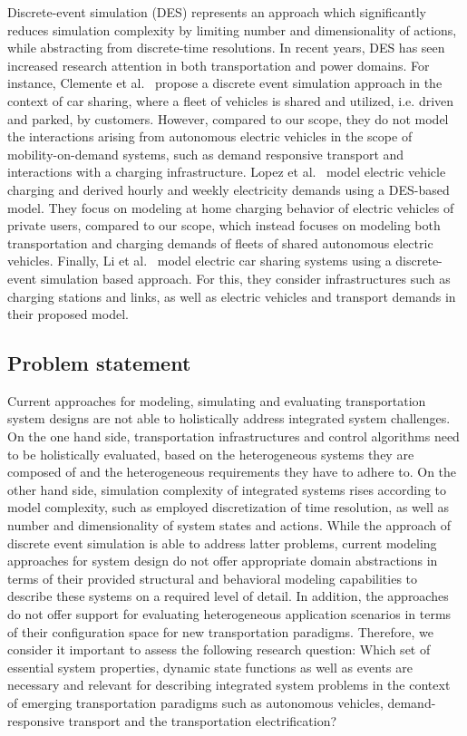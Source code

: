 \documentclass[graybox]{svmult}
\begin{document}
Discrete-event simulation (DES) represents an approach which significantly reduces simulation complexity by limiting number and dimensionality of actions, while abstracting from discrete-time resolutions.
In recent years, DES has seen increased research attention in both transportation \cite{clemente2013discrete, fanti2017fleet} and power \cite{lebeau2013implementing, ferro2019predictive, lopez2021modeling} domains.
For instance, Clemente et al.~\cite{clemente2013discrete} propose a discrete event simulation approach in the context of car sharing, where a fleet of vehicles is shared and utilized, i.e. driven and parked, by customers.
However, compared to our scope, they do not model the interactions arising from autonomous electric vehicles in the scope of mobility-on-demand systems, such as demand responsive transport and interactions with a charging infrastructure.
Lopez et al.~\cite{lopez2021modeling} model electric vehicle charging and derived hourly and weekly electricity demands using a DES-based model.
They focus on modeling at home charging behavior of electric vehicles of private users, compared to our scope, which instead focuses on modeling both transportation and charging demands of fleets of shared autonomous electric vehicles.
Finally, Li et al.~\cite{li2021simulation} model electric car sharing systems using a discrete-event simulation based approach. For this, they consider infrastructures such as charging stations and links, as well as electric vehicles and transport demands in their proposed model.

\subsection{Problem statement}

Current approaches for modeling, simulating and evaluating transportation system designs are not able to holistically address integrated system challenges.
On the one hand side, transportation infrastructures and control algorithms need to be holistically evaluated, based on the heterogeneous systems they are composed of and the heterogeneous requirements they have to adhere to.
On the other hand side, simulation complexity of integrated systems rises according to model complexity, such as employed discretization of time resolution, as well as number and dimensionality of system states and actions.
While the approach of discrete event simulation is able to address latter problems, current modeling approaches for system design do not offer appropriate domain abstractions in terms of their provided structural and behavioral modeling capabilities to describe these systems on a required level of detail.
In addition, the approaches do not offer support for evaluating heterogeneous application scenarios in terms of their configuration space for new transportation paradigms.
Therefore, we consider it important to assess the following research question: Which set of essential system properties, dynamic state functions as well as events are necessary and relevant for describing integrated system problems in the context of emerging transportation paradigms such as autonomous vehicles, demand-responsive transport and the transportation electrification?
\end{document}
